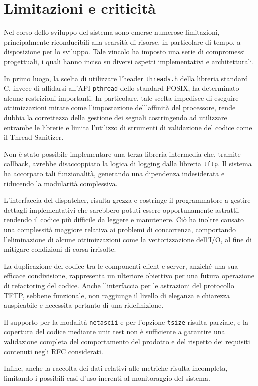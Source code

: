 \documentclass[12pt]{article}
\begin{document}
\pagebreak
\section{Limitazioni e criticità} {


Nel corso dello sviluppo del sistema sono emerse numerose limitazioni, principalmente riconducibili alla scarsità di risorse, in particolare di tempo, a disposizione per lo sviluppo. Tale vincolo ha imposto una serie di compromessi progettuali, i quali hanno inciso su diversi aspetti implementativi e architetturali.

In primo luogo, la scelta di utilizzare l'header \texttt{threads.h} della libreria standard C, invece di affidarsi all'API \texttt{pthread} dello standard POSIX, ha determinato alcune restrizioni importanti. In particolare, tale scelta impedisce di eseguire ottimizzazioni mirate come l'impostazione dell'affinità del processore, rende dubbia la correttezza della gestione dei segnali costringendo ad utilizzare entrambe le librerie e limita l'utilizzo di strumenti di validazione del codice come il Thread Sanitizer.

Non è stato possibile implementare una terza libreria intermedia che, tramite callback, avrebbe disaccoppiato la logica di logging dalla libreria \texttt{tftp}. Il sistema ha accorpato tali funzionalità, generando una dipendenza indesiderata e riducendo la modularità complessiva.

L'interfaccia del dispatcher, risulta grezza e costringe il programmatore a gestire dettagli implementativi che sarebbero potuti essere opportunamente astratti, rendendo il codice più difficile da leggere e manutenere. Ciò ha inoltre causato una complessità maggiore relativa ai problemi di concorrenza, comportando l'eliminazione di alcune ottimizzazioni come la vettorizzazione dell'I/O, al fine di mitigare condizioni di corsa irrisolte.

La duplicazione del codice tra le componenti client e server, anziché una sua efficace condivisione, rappresenta un ulteriore obiettivo per una futura operazione di refactoring del codice. Anche l'interfaccia per le astrazioni del protocollo TFTP, sebbene funzionale, non raggiunge il livello di eleganza e chiarezza auspicabile e necessita pertanto di una ridefinizione.

Il supporto per la modalità \texttt{netascii} e per l'opzione \texttt{tsize} risulta parziale, e la copertura del codice mediante unit test non è sufficiente a garantire una validazione completa del comportamento del prodotto e del rispetto dei requisiti contenuti negli RFC considerati.

Infine, anche la raccolta dei dati relativi alle metriche risulta incompleta, limitando i possibili casi d'uso inerenti al monitoraggio del sistema.

}
\end{document}

